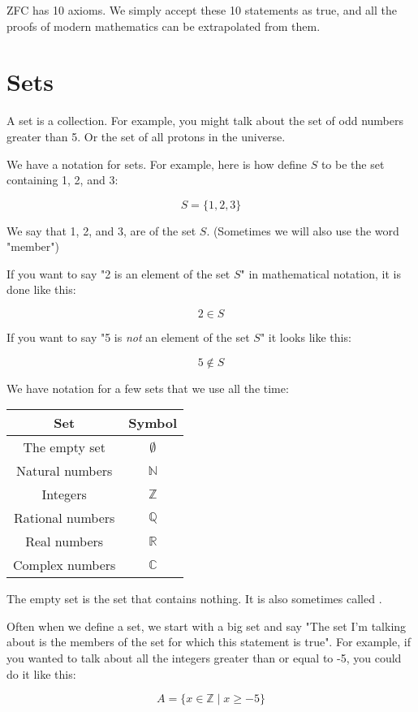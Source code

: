 ZFC has 10 axioms.  We simply accept these 10 statements as true, and
all the proofs of modern mathematics can be extrapolated from them.

\section{Sets}

A set is a collection.  For example, you might talk about the set of
odd numbers greater than 5.  Or the set of all protons in the
universe.  

We have a notation for sets.  For example, here is how define $S$ to
be the set containing 1, 2, and 3:

$$S = \{1, 2, 3\}$$

We say that 1, 2, and 3, are  of the set $S$.
(Sometimes we will also use the word "member")

If you want to say "2 is an element of the set $S$" in mathematical
notation, it is done like this:

$$ 2 \in S$$

If you want to say "5 is \textit{not} an element of the set $S$" it
looks like this:

$$ 5 \notin S$$

We have notation for a few sets that we use all the time:

\begin{tabular}{c|c}
Set & Symbol \\
\hline
The empty set & $\emptyset$ \\
Natural numbers & $\mathbb{N}$ \\
Integers & $\mathbb{Z}$ \\
Rational numbers & $\mathbb{Q}$ \\
Real numbers & $\mathbb{R}$ \\
Complex numbers & $\mathbb{C}$ \\
\end{tabular}

The empty set is the set that contains nothing.  It is also sometimes
called .

Often when we define a set, we start with a big set and say "The set
I'm talking about is the members of the set for which this statement
is true".  For example, if you wanted to talk about all the integers
greater than or equal to -5, you could do it like this:

$$A = \{ x \in \mathbb{Z} \mid x \geq -5 \}$$

